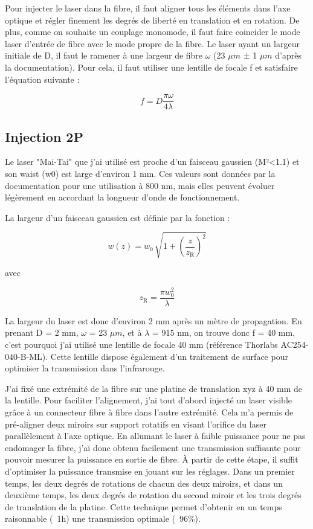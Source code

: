 Pour injecter le laser dans la fibre, il faut aligner tous les éléments dans l'axe optique et régler finement les degrés de liberté en translation et en rotation. De plus, comme on souhaite un couplage monomode, il faut faire coincider le mode laser d'entrée de fibre avec le mode propre de la fibre. Le laser ayant un largeur initiale de D, il faut le ramener à une largeur de fibre $\omega$ (23 $\mu m$ ± 1 $\mu m$ d'après la documentation). Pour cela, il faut utiliser une lentille de focale f et satisfaire l'équation suivante :

$$
f = D\frac{\pi\omega}{4\lambda}
$$

\subsection{Injection 2P}

Le laser "Mai-Tai" que j'ai utilisé est proche d'un faisceau gaussien (M²<1.1) et son waist (w0) est large d'environ 1 mm. Ces valeurs sont données par la documentation pour une utilisation à 800 nm, mais elles peuvent évoluer légèrement en accordant la longueur d'onde de fonctionnement.

La largeur d'un faisceau gaussien est définie par la fonction :

$$
w(z) = w_0 \, \sqrt{ 1+ {\left( \frac{z}{z_\mathrm{R}} \right)}^2 }
$$

avec

$$
z_\mathrm{R} = \frac{\pi w_0^2 }{\lambda}
$$

La largeur du laser est donc d'environ 2 mm après un mètre de propagation. En prenant D = 2 mm, $\omega$ = 23 $\mu m$, et à $\lambda$ = 915 nm, on trouve donc f = 40 mm, c'est pourquoi j'ai utilisé une lentille de focale 40 mm (référence Thorlabs AC254-040-B-ML). Cette lentille dispose également d'un traitement de surface pour optimiser la transmission dans l'infrarouge.

J'ai fixé une extrémité de la fibre sur une platine de translation xyz à 40 mm de la lentille. Pour faciliter l'alignement, j'ai tout d'abord injecté un laser visible grâce à un connecteur fibre à fibre dans l'autre extrémité. Cela m'a permis de pré-aligner deux miroirs sur support rotatifs en visant l'orifice du laser parallèlement à l'axe optique. En allumant le laser à faible puissance pour ne pas endomager la fibre, j'ai donc obtenu facilement une transmission suffisante pour pouvoir mesurer la puissance en sortie de fibre. À partir de cette étape, il suffit d'optimiser la puissance transmise en jouant sur les réglages. Dans un premier temps, les deux degrés de rotations de chacun des deux miroirs, et dans un deuxième temps, les deux degrés de rotation du second miroir et les trois degrés de translation de la platine. Cette technique permet d'obtenir en un temps raisonnable (~1h) une transmission optimale (~96\%).

